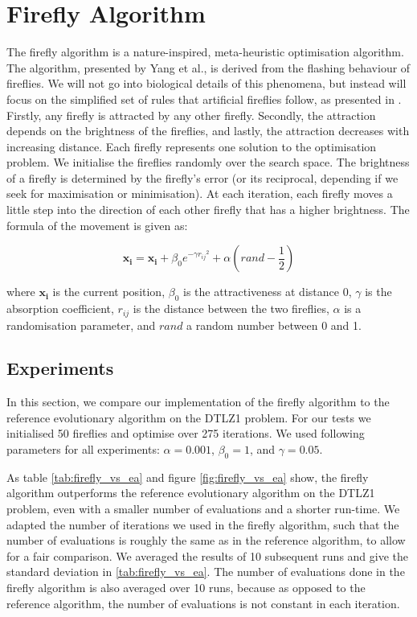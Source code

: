 \section{Firefly Algorithm}

The firefly algorithm is a nature-inspired, meta-heuristic optimisation
algorithm. The algorithm, presented by Yang et al., is derived from the
flashing behaviour of fireflies. We will not go into biological details of this
phenomena, but instead will focus on the simplified set of rules that
artificial fireflies follow, as presented in \cite{firefly}. Firstly, any firefly
is attracted by any other firefly. Secondly, the attraction depends on the
brightness of the fireflies, and lastly, the attraction decreases with increasing
distance.  Each firefly represents one solution to the optimisation problem. We
initialise the fireflies randomly over the search space. The brightness of a
firefly is determined by the firefly's error (or its reciprocal, depending if
we seek for maximisation or minimisation). At each iteration, each firefly
moves a little step into the direction of each other firefly that has a higher
brightness. The formula of the movement is given as:

\begin{equation}
  \boldsymbol{x_i} = \boldsymbol{x_i} + \beta_0 e^{-\gamma {r_{ij}}^2} + \alpha (rand - \frac{1}{2})
\end{equation}

where $\boldsymbol{x_i}$ is the current position, $\beta_0$ is the
attractiveness at distance 0, $\gamma$ is the absorption coefficient, $r_{ij}$
is the distance between the two fireflies, $\alpha$ is a randomisation
parameter, and $rand$ a random number between 0 and 1.

\subsection{Experiments}

In this section, we compare our implementation of the firefly algorithm to the
reference evolutionary algorithm on the DTLZ1 problem. For our tests we
initialised 50 fireflies and optimise over 275 iterations. We used following
parameters for all experiments: $\alpha = 0.001$, $\beta_0 = 1$, and $\gamma = 0.05$.


As table \cref{tab:firefly_vs_ea} and figure \cref{fig:firefly_vs_ea}
show, the firefly algorithm outperforms the reference evolutionary
algorithm on the DTLZ1 problem, even with a smaller number of
evaluations and a shorter run-time. We adapted the number of iterations
we used in the firefly algorithm, such that the number of evaluations
is roughly the same as in the reference algorithm, to allow for a fair
comparison. We averaged the results of 10 subsequent runs and give the
standard deviation in \cref{tab:firefly_vs_ea}. The number of
evaluations done in the firefly algorithm is also averaged over 10
runs, because as opposed to the reference algorithm, the number of
evaluations is not constant in each iteration.

